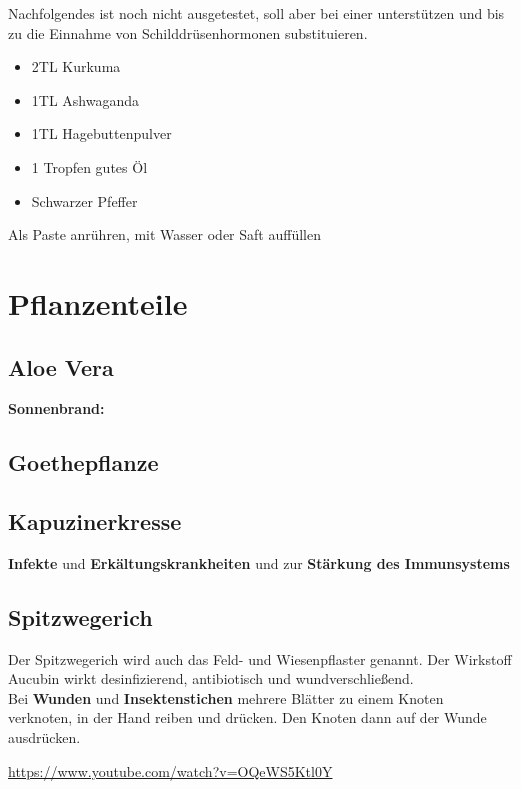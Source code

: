 Nachfolgendes ist noch nicht ausgetestet, soll aber bei einer  unterstützen und bis zu die Einnahme von Schilddrüsenhormonen substituieren.

\begin{itemize}
	\item 2TL Kurkuma
	\item 1TL Ashwaganda
	\item 1TL Hagebuttenpulver
	\item 1 Tropfen gutes Öl
	\item Schwarzer Pfeffer
\end{itemize}

Als Paste anrühren, mit Wasser oder Saft auffüllen



\section{Pflanzenteile}


\subsection{Aloe Vera}

\textbf{Sonnenbrand:}


\subsection{Goethepflanze}





\subsection{Kapuzinerkresse}

\textbf{Infekte} und \textbf{Erkältungskrankheiten} und zur \textbf{Stärkung des Immunsystems}

  






\subsection{Spitzwegerich}

Der Spitzwegerich wird auch das Feld- und Wiesenpflaster genannt. Der Wirkstoff Aucubin wirkt desinfizierend, antibiotisch und wundverschließend.\\
Bei \textbf{Wunden} und \textbf{Insektenstichen} mehrere Blätter zu einem Knoten verknoten, in der Hand reiben und drücken. Den Knoten dann auf der Wunde ausdrücken. 

 

\cite{swrhandwerkskunst}  

\url{https://www.youtube.com/watch?v=OQeWS5Ktl0Y}



